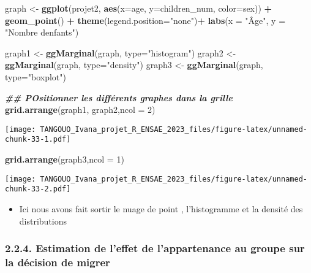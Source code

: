 \documentclass[
]{article}
\newenvironment{Shaded}{\begin{snugshade}}{\end{snugshade}}
\newcommand{\AttributeTok}[1]{\textcolor[rgb]{0.13,0.29,0.53}{#1}}
\newcommand{\DecValTok}[1]{\textcolor[rgb]{0.00,0.00,0.81}{#1}}
\newcommand{\DocumentationTok}[1]{\textcolor[rgb]{0.56,0.35,0.01}{\textbf{\textit{#1}}}}
\newcommand{\FunctionTok}[1]{\textcolor[rgb]{0.13,0.29,0.53}{\textbf{#1}}}
\newcommand{\NormalTok}[1]{#1}
\newcommand{\OtherTok}[1]{\textcolor[rgb]{0.56,0.35,0.01}{#1}}
\newcommand{\SpecialCharTok}[1]{\textcolor[rgb]{0.81,0.36,0.00}{\textbf{#1}}}
\newcommand{\StringTok}[1]{\textcolor[rgb]{0.31,0.60,0.02}{#1}}
\providecommand{\tightlist}{%
  \setlength{\itemsep}{0pt}\setlength{\parskip}{0pt}}
\begin{document}
\begin{Shaded}
\begin{Highlighting}[]
\NormalTok{graph }\OtherTok{\textless{}{-}} \FunctionTok{ggplot}\NormalTok{(projet2, }\FunctionTok{aes}\NormalTok{(}\AttributeTok{x=}\NormalTok{age, }\AttributeTok{y=}\NormalTok{children\_num, }\AttributeTok{color=}\NormalTok{sex)) }\SpecialCharTok{+}
      \FunctionTok{geom\_point}\NormalTok{() }\SpecialCharTok{+}
      \FunctionTok{theme}\NormalTok{(}\AttributeTok{legend.position=}\StringTok{"none"}\NormalTok{)}\SpecialCharTok{+}
      \FunctionTok{labs}\NormalTok{(}\AttributeTok{x =} \StringTok{"Âge"}\NormalTok{, }\AttributeTok{y =} \StringTok{"Nombre d\textquotesingle{}enfants"}\NormalTok{)}

\NormalTok{graph1 }\OtherTok{\textless{}{-}} \FunctionTok{ggMarginal}\NormalTok{(graph, }\AttributeTok{type=}\StringTok{"histogram"}\NormalTok{)}
\NormalTok{graph2 }\OtherTok{\textless{}{-}} \FunctionTok{ggMarginal}\NormalTok{(graph, }\AttributeTok{type=}\StringTok{"density"}\NormalTok{)}
\NormalTok{graph3 }\OtherTok{\textless{}{-}} \FunctionTok{ggMarginal}\NormalTok{(graph, }\AttributeTok{type=}\StringTok{"boxplot"}\NormalTok{)}


\DocumentationTok{\#\# POsitionner les différents  graphes dans la grille}
\FunctionTok{grid.arrange}\NormalTok{(graph1, graph2,}\AttributeTok{ncol =} \DecValTok{2}\NormalTok{)}
\end{Highlighting}
\end{Shaded}

\texttt{[image: TANGOUO\_Ivana\_projet\_R\_ENSAE\_2023\_files/figure-latex/unnamed-chunk-33-1.pdf]}

\begin{Shaded}
\begin{Highlighting}[]
\FunctionTok{grid.arrange}\NormalTok{(graph3,}\AttributeTok{ncol =} \DecValTok{1}\NormalTok{)}
\end{Highlighting}
\end{Shaded}

\texttt{[image: TANGOUO\_Ivana\_projet\_R\_ENSAE\_2023\_files/figure-latex/unnamed-chunk-33-2.pdf]}

\begin{itemize}
\tightlist
\item
  Ici nous avons fait sortir le nuage de point , l'histogramme et la
  densité des distributions
\end{itemize}

\hypertarget{estimation-de-leffet-de-lappartenance-au-groupe-sur-la-duxe9cision-de-migrer}{%
\subsubsection{2.2.4. Estimation de l'effet de l'appartenance au groupe
sur la décision de
migrer}\label{estimation-de-leffet-de-lappartenance-au-groupe-sur-la-duxe9cision-de-migrer}}
\end{document}
